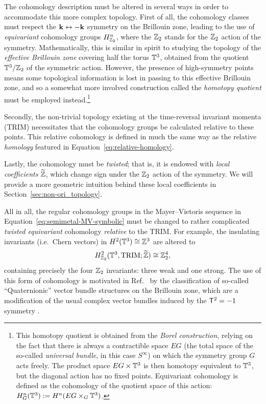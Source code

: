 The cohomology description must be altered in several ways in order to accommodate this more complex topology. First of all, the cohomology classes must respect the $\vb{k}\leftrightarrow-\vb{k}$ symmetry on the Brillouin zone, leading to the use of \emph{equivariant} cohomology groups $H_{\mathbb{Z}_2}^n$, where the $\mathbb{Z}_2$ stands for the $\mathbb{Z}_2$ action of the symmetry. Mathematically, this is similar in spirit to studying the topology of the \emph{effective Brillouin zone} covering half the torus $\mathbb{T}^3$, obtained from the quotient $\mathbb{T}^3/\mathbb{Z}_2$ of the symmetric action. However, the presence of high-symmetry points means some topological information is lost in passing to this effective Brillouin zone, and so a somewhat more involved construction called the \emph{homotopy quotient} must be employed instead.\footnote{
	This homotopy quotient is obtained from the \emph{Borel construction}, relying on the fact that there is always a contractible space $EG$ (the total space of the so-called \emph{universal bundle}, in this case $S^\infty$) on which the symmetry group $G$ acts freely. The product space $EG\times\mathbb{T}^3$ is then homotopy equivalent to $\mathbb{T}^3$, but the diagonal action has no fixed points. Equivariant cohomology is defined as the cohomology of the quotient space of this action: $H_G^n(\mathbb{T}^3) := H^n(EG\times_G\mathbb{T}^3)$.}

Secondly, the non-trivial topology existing at the time-reversal invariant momenta (TRIM) necessitates that the cohomology groups be calculated relative to these points. This relative cohomology is defined in much the same way as the relative \emph{homology} featured in Equation~\eqref{eq:relative-homology}.

Lastly, the cohomology must be \emph{twisted}; that is, it is endowed with \emph{local coefficients} $\widetilde{\mathbb{Z}}$, which change sign under the $\mathbb{Z}_2$ action of the symmetry. We will provide a more geometric intuition behind these local coefficients in Section~\ref{sec:non-ori_topology}.

All in all, the regular cohomology groups in the Mayer--Vietoris sequence in Equation~\eqref{eq:semimetal-MV-symbolic} must be changed to rather complicated \emph{twisted equivariant} cohomology \emph{relative} to the TRIM. For example, the insulating invariants (i.e.\ Chern vectors) in $H^2(\mathbb{T}^3)\cong\mathbb{Z}^3$ are altered to
\begin{equation*}
	H_{\mathbb{Z}_2}^2(\mathbb{T}^3, \text{TRIM}; \widetilde{\mathbb{Z}}) \cong \mathbb{Z}_2^4,
\end{equation*}
containing precisely the four $\mathbb{Z}_2$ invariants: three weak and one strong. The use of this form of cohomology is motivated in Ref.~\cite{Thiang_equivariant} by the classification of so-called ``Quaternionic'' vector bundle structures on the Brillouin zone, which are a modification of the usual complex vector bundles induced by the $\mathsf{T}^2=-1$ symmetry \cite{NittisGomi_Quaternionic,NittisGomi_FKMM}.

